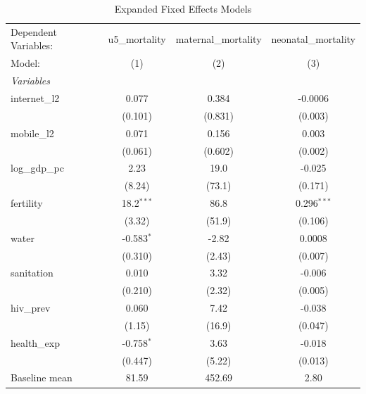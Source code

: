 \begin{table}[htbp]
   \caption{\label{tab:expanded_fe} Expanded Fixed Effects Models}
   \centering
   \begin{tabular}{lccc}
      \tabularnewline \midrule \midrule
      Dependent Variables: & u5\_mortality  & maternal\_mortality  & neonatal\_mortality\\   
      Model:               & (1)            & (2)                  & (3)\\  
      \midrule
      \emph{Variables}\\
      internet\_l2         & 0.077          & 0.384                & -0.0006\\   
                           & (0.101)        & (0.831)              & (0.003)\\   
      mobile\_l2           & 0.071          & 0.156                & 0.003\\   
                           & (0.061)        & (0.602)              & (0.002)\\   
      log\_gdp\_pc         & 2.23           & 19.0                 & -0.025\\   
                           & (8.24)         & (73.1)               & (0.171)\\   
      fertility            & 18.2$^{***}$   & 86.8                 & 0.296$^{***}$\\   
                           & (3.32)         & (51.9)               & (0.106)\\   
      water                & -0.583$^{*}$   & -2.82                & 0.0008\\   
                           & (0.310)        & (2.43)               & (0.007)\\   
      sanitation           & 0.010          & 3.32                 & -0.006\\   
                           & (0.210)        & (2.32)               & (0.005)\\   
      hiv\_prev            & 0.060          & 7.42                 & -0.038\\   
                           & (1.15)         & (16.9)               & (0.047)\\   
      health\_exp          & -0.758$^{*}$   & 3.63                 & -0.018\\   
                           & (0.447)        & (5.22)               & (0.013)\\   
      Baseline mean        & 81.59          & 452.69               & 2.80\\  

\end{tabular}
\end{table}
